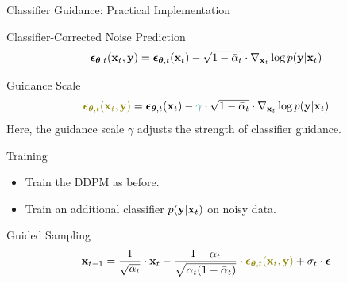 \documentclass{beamer}
\begin{document}
\begin{frame}{Classifier Guidance: Practical Implementation}
	\begin{block}{Classifier-Corrected Noise Prediction}
		\vspace{-0.3cm}
		\[
			\boldsymbol{\epsilon}_{\boldsymbol{\theta}, t}(\mathbf{x}_t, \mathbf{y}) = \boldsymbol{\epsilon}_{\boldsymbol{\theta}, t}(\mathbf{x}_t) - \sqrt{1 - \bar{\alpha}_t} \cdot \nabla_{\mathbf{x}_t} \log p(\mathbf{y} | \mathbf{x}_t)
		\]
		\vspace{-0.5cm}
	\end{block}
	\eqpause
	\begin{block}{Guidance Scale}
		\vspace{-0.3cm}
		\[
			{\color{olive}\bepsilon_{\btheta, t}(\bx_t, \by)} = \bepsilon_{\btheta, t}(\bx_t) - {\color{teal}\gamma} \cdot \sqrt{1 - \bar{\alpha}_t} \cdot \nabla_{\bx_t} \log p(\by | \bx_t)
		\]
		Here, the {\color{teal}guidance scale $\gamma$} adjusts the strength of classifier guidance.
	\end{block}
	\eqpause
	\begin{block}{Training}
		\begin{itemize}
			\item Train the DDPM as before.
			\item Train an additional classifier $p(\mathbf{y} | \mathbf{x}_t)$ on noisy data.
		\end{itemize}
		\vspace{-0.2cm}
	\end{block}
	\eqpause
	\begin{block}{Guided Sampling}
		\vspace{-0.3cm}
		\[
			\bx_{t-1} = \frac{1}{\sqrt{\alpha_t}} \cdot \bx_t - \frac{1 - \alpha_t}{\sqrt{\alpha_t (1 - \bar{\alpha}_t)}} \cdot  {\color{olive}\bepsilon_{\btheta, t}(\bx_t, \by)} + \sigma_t \cdot \bepsilon
		\]
	\end{block}
\end{frame}
\end{document}
